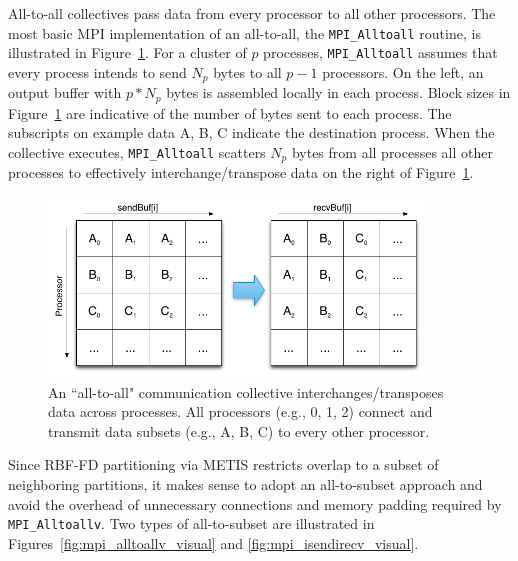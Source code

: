 \documentclass{report}
\begin{document}
All-to-all collectives pass data from every processor to all other processors. The most basic MPI implementation of an all-to-all, the \texttt{MPI\_Alltoall} routine, is illustrated in Figure~\ref{fig:mpi_alltoall_visual}. For a cluster of $p$ processes, \texttt{MPI\_Alltoall} assumes that every process intends to send $N_p$ bytes to all $p-1$ processors. On the left, an output buffer with $p*N_p$ bytes is assembled locally in each process. Block sizes in Figure~\ref{fig:mpi_alltoall_visual} are indicative of the number of bytes sent to each process. The subscripts on example data A, B, C indicate the destination process.  When the collective executes, \texttt{MPI\_Alltoall} scatters $N_p$ bytes from all processes all other processes to effectively interchange/transpose data on the right of Figure~\ref{fig:mpi_alltoall_visual}. 

\begin{figure}
\centering
\includegraphics[width=10cm]{../figures/omnigraffle/MPI_Alltoall_Visual.png}
\caption{An ``all-to-all" communication collective interchanges/transposes data across processes. All processors (e.g., 0, 1, 2) connect and transmit data subsets (e.g., A, B, C) to every other processor.}
\label{fig:mpi_alltoall_visual}
\end{figure}

Since RBF-FD partitioning via METIS restricts overlap to a subset of neighboring partitions, it makes sense to adopt an all-to-subset approach and avoid the overhead of unnecessary connections and memory padding required by \texttt{MPI\_Alltoallv}. 
Two types of all-to-subset are illustrated in Figures~\ref{fig:mpi_alltoallv_visual} and \ref{fig:mpi_isendirecv_visual}. 
\end{document}
